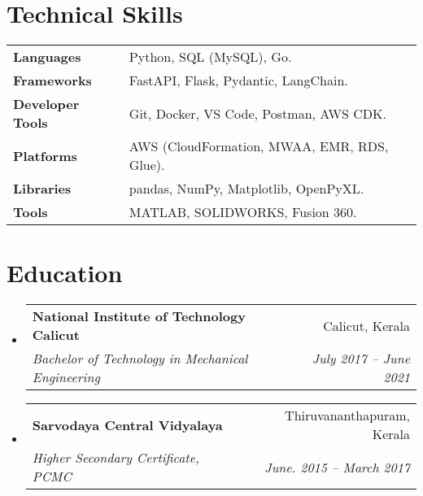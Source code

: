 \documentclass[a4paper,11pt]{article}
\makeatletter
\newcommand{\resumeItem}[1]{
  \item\small{
    {#1 \vspace{-2pt}}
  }
}
\newcommand{\resumeSubheading}[4]{
  \vspace{-2pt}\item
    \begin{tabular*}{0.97\textwidth}[t]{l@{\extracolsep{\fill}}r}
      \textbf{#1} & #2 \\
      \textit{\small#3} & \textit{\small #4} \\
    \end{tabular*}\vspace{-7pt}
}
\newcommand{\resumeProjectHeading}[2]{
    \item
    \begin{tabular*}{0.97\textwidth}{l@{\extracolsep{\fill}}r}
      \small#1 & #2 \\
    \end{tabular*}\vspace{-7pt}
}
\newcommand{\resumeSubHeadingListStart}{\begin{itemize}[leftmargin=0.15in, label={}]}
\newcommand{\resumeSubHeadingListEnd}{\end{itemize}}
\newcommand{\resumeItemListStart}{\begin{itemize}}
\newcommand{\resumeItemListEnd}{\end{itemize}\vspace{-5pt}}
\makeatother
\begin{document}


\section{Technical Skills}
  \resumeSubHeadingListStart
      \small{\item{
          \begin{tabular}{l @{\hskip 10pt} l}
              \textbf{Languages} & Python, SQL (MySQL), Go. \\
              \textbf{Frameworks} & FastAPI, Flask, Pydantic, LangChain. \\
            \textbf{Developer Tools} & Git, Docker, VS Code, Postman, AWS CDK. \\
            \textbf{Platforms} & AWS (CloudFormation, MWAA, EMR, RDS, Glue). \\
            \textbf{Libraries} & pandas, NumPy, Matplotlib, OpenPyXL. \\
            \textbf{Tools} & MATLAB, SOLIDWORKS, Fusion 360.
        \end{tabular}
      }}
  \resumeSubHeadingListEnd


\section{Education}
  \resumeSubHeadingListStart
    \resumeSubheading
      {National Institute of Technology Calicut}{Calicut, Kerala}
      {Bachelor of Technology in Mechanical Engineering}{July 2017 -- June 2021}
    \resumeSubheading
      {Sarvodaya Central Vidyalaya}{Thiruvananthapuram, Kerala}
      {Higher Secondary Certificate, PCMC}{June. 2015 -- March 2017}
    \vspace{2pt}
  \resumeSubHeadingListEnd


\end{document}
